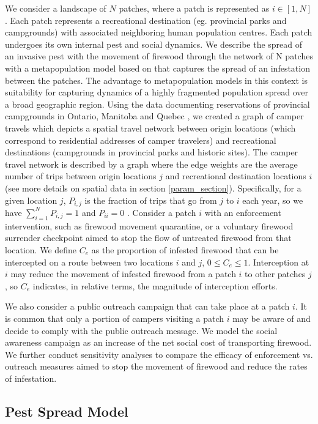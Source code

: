 We consider a landscape of $N$ patches, where a patch is represented as $i \in [1,N]$. Each patch represents a recreational destination (eg. provincial parks and campgrounds) with associated neighboring human population centres. Each patch undergoes its own internal pest and social dynamics. We describe the spread of an invasive pest with the movement of firewood through the network of N patches with a metapopulation model based on \cite{barlow2014modelling} that captures the spread of an infestation between the patches. The advantage to metapopulation models in this context is suitability for capturing dynamics of a highly fragmented population spread over a broad geographic region. Using the data documenting reservations of provincial campgrounds in Ontario, Manitoba and Quebec \cite{yemshanov2015optimal}, we created a graph of camper travels which depicts a spatial travel network between origin locations (which correspond to residential addresses of camper travelers) and recreational destinations (campgrounds in provincial parks and historic sites). 
The camper travel network is described by a graph where the edge weights are the average number of trips between origin locations $j$ and recreational destination locations $i$ (see more details on spatial data in section \ref{param_section}). Specifically, for a given location $j$, $P_{i,j}$ is the fraction of trips that go from $j$ to $i$ each year, so we have $\sum_{i = 1}^N P_{i,j} = 1$ and $P_{ii} = 0$ .
Consider a patch $i$ with an enforcement intervention, such as firewood movement quarantine, or a voluntary firewood surrender checkpoint aimed to stop the flow of untreated firewood from that location. We define $C_e$ as the proportion of infested firewood that can be intercepted on a route between two locations $i$ and $j$, $0 \leq C_e \leq 1$. Interception at $i$ may reduce the movement of infested firewood from a patch $i$ to other patches $j$, so $C_e$ indicates, in relative terms, the magnitude of interception efforts. 

We also consider a public outreach campaign that can take place at a patch $i$. It is common that only a portion of campers visiting a patch $i$ may be aware of and decide to comply with the public outreach message. We model the social awareness campaign as an increase of the net social cost of transporting firewood. We further conduct sensitivity analyses to compare the efficacy of enforcement vs. outreach measures aimed to stop the movement of firewood and reduce the rates of infestation.


\subsection{Pest Spread Model}

